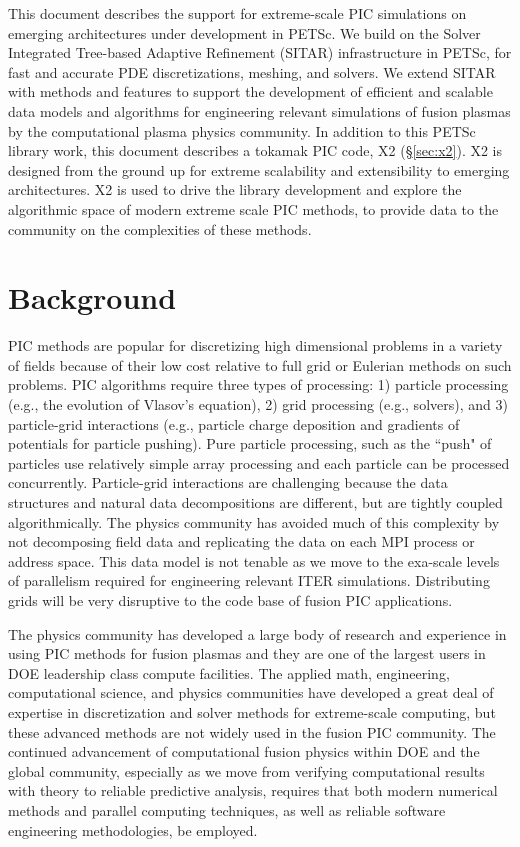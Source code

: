 \documentclass[review]{siamart}
\begin{document}
This document describes the support for extreme-scale PIC simulations on emerging architectures under development in PETSc.
We build on the Solver Integrated Tree-based Adaptive Refinement (SITAR) infrastructure in PETSc, for fast and accurate PDE discretizations, meshing, and solvers.
We extend SITAR with methods and features to support the development of efficient and scalable data models and algorithms for engineering relevant simulations of fusion plasmas by the computational plasma physics community.
In addition to this PETSc library work, this document describes a tokamak PIC code, X2 (\S\ref{sec:x2}).
X2 is designed from the ground up for extreme scalability and extensibility to emerging architectures.
X2 is used to drive the library development and explore the algorithmic space of modern extreme scale PIC methods, to provide data to the community on the complexities of these methods.

\section{Background}

PIC methods are popular for discretizing high dimensional problems in a variety of fields because of their low cost relative to full grid or Eulerian methods on such problems.
PIC algorithms require three types of processing: 1) particle processing (e.g., the evolution of Vlasov's equation), 2) grid processing (e.g., solvers), and 3) particle-grid interactions (e.g., particle charge deposition and gradients of potentials for particle pushing).
Pure particle processing, such as the ``push" of particles use relatively simple array processing and each particle can be processed concurrently.
Particle-grid interactions are challenging because the data structures and natural data decompositions are different, but are tightly coupled algorithmically.
The physics community has avoided much of this complexity by not decomposing field data and replicating the data on each MPI process or address space.
This data model is not tenable as we move to the exa-scale levels of parallelism required for engineering relevant ITER simulations.
Distributing grids will be very disruptive to the code base of fusion PIC applications.

The physics community has developed a large body of research and experience in using PIC methods for fusion plasmas and they are one of the largest users in DOE leadership class compute facilities.
The applied math, engineering, computational science, and physics communities have developed a great deal of expertise in discretization and solver methods for extreme-scale computing, but these advanced methods are not widely used in the fusion PIC community.
The continued advancement of computational fusion physics within DOE and the global community, especially as we move from verifying computational results with theory to reliable predictive analysis, requires that both modern numerical methods and parallel computing techniques, as well as reliable software engineering methodologies, be employed.
\end{document}
